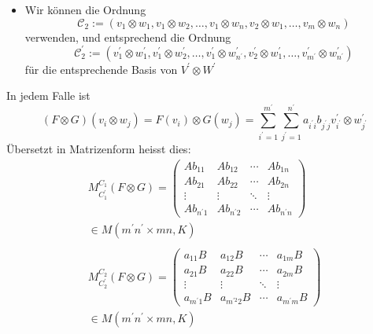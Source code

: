{\begin{itemize}
                \[
                \mathcal{C}_{1}^{\prime}:=\left(v_{1}^{\prime} \otimes w_{1}^{\prime}, v_{2}^{\prime} \otimes w_{1}^{\prime}, \ldots, v_{m^{\prime}}^{\prime} \otimes w_{1}^{\prime}, v_{1}^{\prime} \otimes w_{2}^{\prime}, \ldots, v_{m^{\prime}}^{\prime} \otimes w_{n^{\prime}}^{\prime}\right)
                \]
                für die entsprechende Basis von $V^{\prime} \otimes W^{\prime}$
        \item Wir können die Ordnung
                \[
                \mathcal{C}_{2}:=\left(v_{1} \otimes w_{1}, v_{1} \otimes w_{2}, \ldots, v_{1} \otimes w_{n}, v_{2} \otimes w_{1}, \ldots, v_{m} \otimes w_{n}\right)
                \]
                verwenden, und entsprechend die Ordnung
                \[
                \mathcal{C}_{2}^{\prime}:=\left(v_{1}^{\prime} \otimes w_{1}^{\prime}, v_{1}^{\prime} \otimes w_{2}^{\prime}, \ldots, v_{1}^{\prime} \otimes w_{n^{\prime}}^{\prime}, v_{2}^{\prime} \otimes w_{1}^{\prime}, \ldots, v_{m^{\prime}}^{\prime} \otimes w_{n^{\prime}}^{\prime}\right)
                \]
                für die entsprechende Basis von $V^{\prime} \otimes W^{\prime}$
    \end{itemize}

    \vspace{1\baselineskip}

    In jedem Falle ist
    \[
    (F \otimes G)\left(v_{i} \otimes w_{j}\right) = F(v_i) \otimes G(w_j) =\sum_{i^{\prime}=1}^{m^{\prime}} \sum_{j^{\prime}=1}^{n^{\prime}} a_{i^{\prime} i} b_{j^{\prime} j} v_{i^{\prime}}^{\prime} \otimes w_{j^{\prime}}^{\prime}
    \]
    Übersetzt in Matrizenform heisst dies: \\
    \[
    \begin{array}{l}
    M_{C_{1}^{\prime}}^{C_{1}}(F \otimes G)=\left(\begin{array}{cccc}
    A b_{11} & A b_{12} & \cdots & A b_{1 n} \\
    A b_{21} & A b_{22} & \cdots & A b_{2 n} \\
    \vdots & \vdots & \ddots & \vdots \\
    A b_{n^{\prime} 1} & A b_{n^{\prime} 2} & \cdots & A b_{n^{\prime} n}
    \end{array}\right) \\  \in M\left(m^{\prime} n^{\prime} \times m n, K\right) \\ \\
    M_{C_{2}^{\prime}}^{C_{2}}(F \otimes G)=\left(\begin{array}{cccc}
    a_{11} B & a_{12} B & \cdots & a_{1 m} B \\
    a_{21} B & a_{22} B & \cdots & a_{2 m} B \\
    \vdots & \vdots & \ddots & \vdots \\
    a_{m^{\prime} 1} B & a_{m^{\prime 2} 2} B & \cdots & a_{m^{\prime} m} B
    \end{array}\right) \\ \in M\left(m^{\prime} n^{\prime} \times m n, K\right)
    \end{array}
    \]
}


